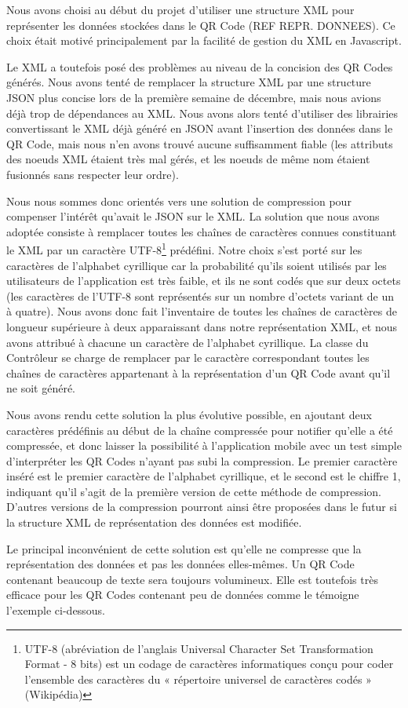 \par
Nous avons choisi au début du projet d'utiliser une structure XML pour représenter les données stockées dans le QR Code (REF REPR. DONNEES). Ce choix était motivé principalement par la facilité de gestion du XML en Javascript.
\par
Le XML a toutefois posé des problèmes au niveau de la concision des QR Codes générés. Nous avons tenté de remplacer la structure XML par une structure JSON plus concise lors de la première semaine de décembre, mais nous avions déjà trop de dépendances au XML. Nous avons alors tenté d'utiliser des librairies convertissant le XML déjà généré en JSON avant l'insertion des données dans le QR Code, mais nous n'en avons trouvé aucune suffisamment fiable (les attributs des noeuds XML étaient très mal gérés, et les noeuds de même nom étaient fusionnés sans respecter leur ordre).\\
\par
Nous nous sommes donc orientés vers une solution de compression pour compenser l'intérêt qu'avait le JSON sur le XML. La solution que nous avons adoptée consiste à remplacer toutes les chaînes de caractères connues constituant le XML par un caractère UTF-8\footnote{UTF-8 (abréviation de l’anglais Universal Character Set Transformation Format - 8 bits) est un codage de caractères informatiques conçu pour coder l’ensemble des caractères du « répertoire universel de caractères codés » (Wikipédia)} prédéfini. Notre choix s'est porté sur les caractères de l'alphabet cyrillique car la probabilité qu'ils soient utilisés par les utilisateurs de l'application est très faible, et ils ne sont codés que sur deux octets (les caractères de l'UTF-8 sont représentés sur un nombre d'octets variant de un à quatre). Nous avons donc fait l'inventaire de toutes les chaînes de caractères de longueur supérieure à deux apparaissant dans notre représentation XML, et nous avons attribué à chacune un caractère de l'alphabet cyrillique. La classe  du Contrôleur se charge de remplacer par le caractère correspondant toutes les chaînes de caractères appartenant à la représentation d'un QR Code avant qu'il ne soit généré.\\
\par
Nous avons rendu cette solution la plus évolutive possible, en ajoutant deux caractères prédéfinis au début de la chaîne compressée pour notifier qu'elle a été compressée, et donc laisser la possibilité à l'application mobile avec un test simple d'interpréter les QR Codes n'ayant pas subi la compression. Le premier caractère inséré est le premier caractère de l'alphabet cyrillique, et le second est le chiffre 1, indiquant qu'il s'agit de la première version de cette méthode de compression. D'autres versions de la compression pourront ainsi être proposées dans le futur si la structure XML de représentation des données est modifiée.\\
\par
Le principal inconvénient de cette solution est qu'elle ne compresse que la représentation des données et pas les données elles-mêmes. Un QR Code contenant beaucoup de texte sera toujours volumineux. Elle est toutefois très efficace pour les QR Codes contenant peu de données comme le témoigne l'exemple ci-dessous.

